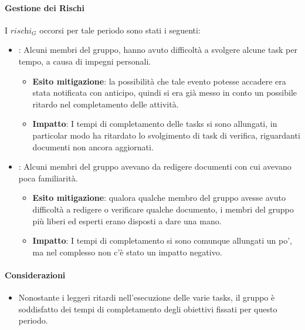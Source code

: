\paragraph*{Gestione dei Rischi}
I $\textit{rischi}_G$ occorsi per tale periodo sono stati i seguenti:
\begin{itemize}
    \item {}: Alcuni membri del gruppo, hanno avuto difficoltà a svolgere alcune task per tempo, a causa di impegni personali.
    \begin{itemize}
        \item \textbf{Esito mitigazione}: la possibilità che tale evento potesse accadere era stata notificata con anticipo, quindi si era già messo in conto un possibile ritardo nel completamento delle attività.
        \item \textbf{Impatto}: I tempi di completamento delle tasks si sono allungati, in particolar modo ha ritardato lo svolgimento di task di verifica, riguardanti documenti non ancora aggiornati.
    \end{itemize}
    \item {}: Alcuni membri del gruppo avevano da redigere documenti con cui avevano poca familiarità.
    \begin{itemize}
        \item \textbf{Esito mitigazione}: qualora qualche membro del gruppo avesse avuto difficoltà a redigere o verificare qualche documento, i membri del gruppo più liberi ed esperti erano disposti a dare una mano.
        \item \textbf{Impatto}: I tempi di completamento si sono comunque allungati un po', ma nel complesso non c'è stato un impatto negativo.
    \end{itemize}
\end{itemize}
\paragraph*{Considerazioni}
\begin{itemize}
    \item Nonostante i leggeri ritardi nell'esecuzione delle varie tasks, il gruppo è soddisfatto dei tempi di completamento degli obiettivi fissati per questo periodo.
\end{itemize}